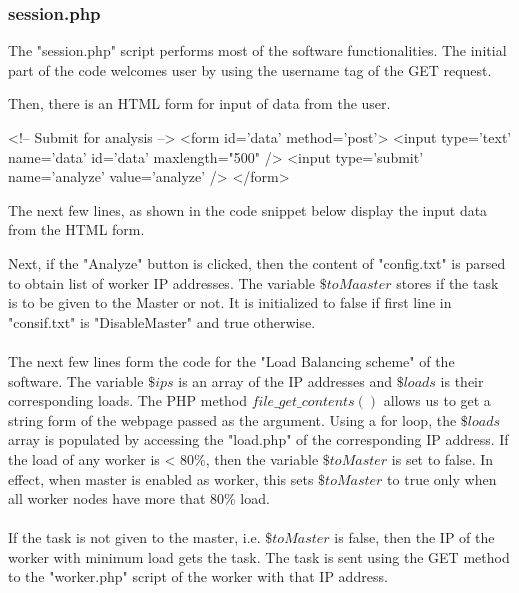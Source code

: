 \documentclass{article}
\begin{document}
\subsubsection{session.php}
The "session.php" script performs most of the software functionalities. The initial part of the code welcomes user by using the username tag of the GET request.

Then, there is an HTML form for input of data from the user.
\begin{php}
<!-- Submit for analysis -->
<form id='data' method='post'>
<input type='text' name='data' id='data'  maxlength="500" />
<input type='submit' name='analyze' value='analyze' />
</form>
\end{php}
The next few lines, as shown in the code snippet below display the input data from the HTML form.
Next, if the "Analyze" button is clicked, then the content of "config.txt" is parsed to obtain list of worker IP addresses. The variable $\$toMaaster$ stores if the task is to be given to the Master or not. It is initialized to false if first line in "consif.txt" is "DisableMaster" and true otherwise.\\ \\
The next few lines form the code for the "Load Balancing scheme" of the software. The variable $\$ips$ is an array of the IP addresses and $\$loads$ is their corresponding loads. The PHP method $file\_get\_contents()$ allows us to get a string form of the webpage passed as the argument. Using a for loop, the $\$loads$ array is populated by accessing the "load.php" of the corresponding IP address. If the load of any worker is < 80\%, then the variable $\$toMaster$ is set to false. In effect, when master is enabled as worker, this sets $\$toMaster$ to true only when all worker nodes have more that 80\% load.\\ \\
If the task is not given to the master, i.e. $\$toMaster$ is false, then the IP of the worker with minimum load gets the task. The task is sent using the GET method to the "worker.php" script of the worker with that IP address.  
\end{document}
